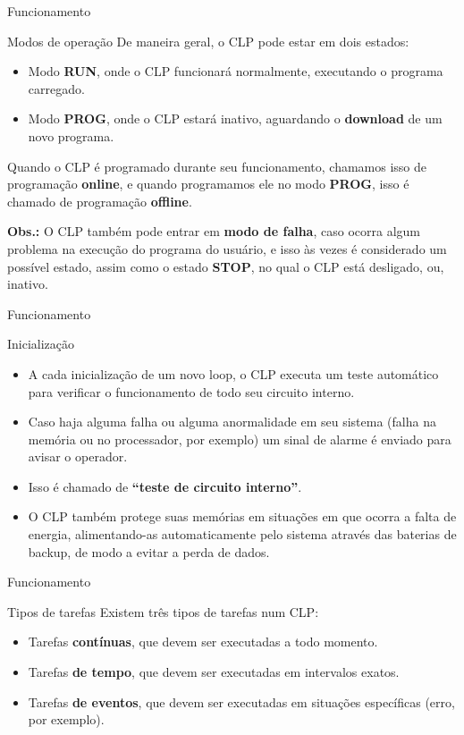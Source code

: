 \begin{frame}{Funcionamento}
	\begin{block}{Modos de operação}
		De maneira geral, o CLP pode estar em dois estados:
		\begin{itemize}
			\item Modo \textbf{RUN}, onde o CLP funcionará normalmente, executando o programa carregado.
			\item Modo \textbf{PROG}, onde o CLP estará inativo, aguardando o \textbf{download} de um novo programa.
		\end{itemize}
		Quando o CLP é programado durante seu funcionamento, chamamos isso de programação \textbf{online}, e quando programamos ele no modo \textbf{PROG}, isso é chamado de programação \textbf{offline}.
		
		\medskip
		
		\textbf{Obs.:} O CLP também pode entrar em \textbf{modo de falha}, caso ocorra algum problema na execução do programa do usuário, e isso às vezes é considerado um possível estado, assim como o estado \textbf{STOP}, no qual o CLP está desligado, ou, inativo.
	\end{block}
\end{frame}


\begin{frame}{Funcionamento}
	\begin{block}{Inicialização}
		\begin{itemize}
			\item A cada inicialização de um novo loop, o CLP executa um teste automático para verificar o funcionamento de todo seu circuito interno.
			\item Caso haja alguma falha ou alguma anormalidade em seu sistema (falha na memória ou no	processador, por exemplo) um sinal de alarme é enviado para avisar o operador.
			\item Isso é chamado de \textbf{``teste de circuito interno''}.
			\item O CLP também protege suas memórias em situações em que ocorra a falta de energia, alimentando-as automaticamente pelo sistema através das baterias de backup, de modo a evitar a perda de dados.
		\end{itemize}
	\end{block}
\end{frame}


\begin{frame}{Funcionamento}
	\begin{block}{Tipos de tarefas}
		Existem três tipos de tarefas num CLP:
		\begin{itemize}
			\item Tarefas \textbf{contínuas}, que devem ser executadas a todo momento.
			\item Tarefas \textbf{de tempo}, que devem ser executadas em intervalos exatos.
			\item Tarefas \textbf{de eventos}, que devem ser executadas em situações específicas (erro, por exemplo).
		\end{itemize}
	\end{block}
\end{frame}


